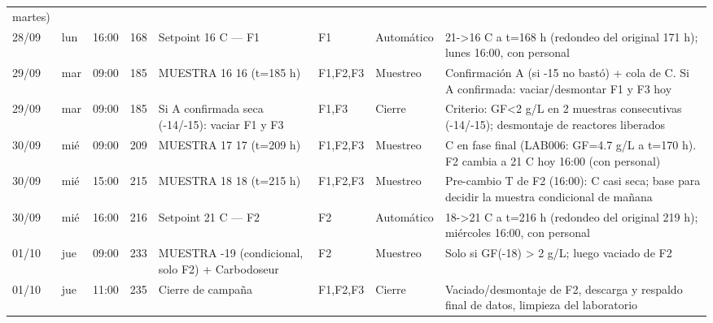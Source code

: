 \documentclass[10pt,landscape]{article}
\begin{document}
{\begin{longtable}{L{1.7cm} L{1.2cm} L{1.1cm} c L{4.6cm} L{1.6cm} L{1.7cm} L{7.2cm}}
martes) \\28/09 & lun & 16:00 & 168 & Setpoint 16 \textdegree{}C — F1 & F1 & Automático & 21->16 \textdegree{}C a t=168 h (redondeo del original 171 h); lunes 16:00, con personal \\29/09 & mar & 09:00 & 185 & MUESTRA 16 16 (t=185 h) & F1,F2,F3 & Muestreo & Confirmación A (si -15 no bastó) + cola de C. Si A confirmada: vaciar/desmontar F1 y F3 hoy \\29/09 & mar & 09:00 & 185 & Si A confirmada seca (-14/-15): vaciar F1 y F3 & F1,F3 & Cierre & Criterio: GF<2 g/L en 2 muestras consecutivas (-14/-15); desmontaje de reactores liberados \\30/09 & mié & 09:00 & 209 & MUESTRA 17 17 (t=209 h) & F1,F2,F3 & Muestreo & C en fase final (LAB006: GF=4.7 g/L a t=170 h). F2 cambia a 21 \textdegree{}C hoy 16:00 (con personal) \\30/09 & mié & 15:00 & 215 & MUESTRA 18 18 (t=215 h) & F1,F2,F3 & Muestreo & Pre-cambio T de F2 (16:00): C casi seca; base para decidir la muestra condicional de mañana \\30/09 & mié & 16:00 & 216 & Setpoint 21 \textdegree{}C — F2 & F2 & Automático & 18->21 \textdegree{}C a t=216 h (redondeo del original 219 h); miércoles 16:00, con personal \\01/10 & jue & 09:00 & 233 & MUESTRA -19 (condicional, solo F2) + Carbodoseur & F2 & Muestreo & Solo si GF(-18) > 2 g/L; luego vaciado de F2 \\01/10 & jue & 11:00 & 235 & Cierre de campaña & F1,F2,F3 & Cierre & Vaciado/desmontaje de F2, descarga y respaldo final de datos, limpieza del laboratorio \\
\bottomrule
\end{longtable}
}
\end{document}
